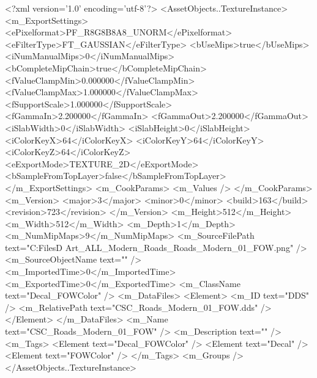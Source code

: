 <?xml version='1.0' encoding='utf-8'?>
<AssetObjects..TextureInstance>
  <m_ExportSettings>
    <ePixelformat>PF_R8G8B8A8_UNORM</ePixelformat>
    <eFilterType>FT_GAUSSIAN</eFilterType>
    <bUseMips>true</bUseMips>
    <iNumManualMips>0</iNumManualMips>
    <bCompleteMipChain>true</bCompleteMipChain>
    <fValueClampMin>0.000000</fValueClampMin>
    <fValueClampMax>1.000000</fValueClampMax>
    <fSupportScale>1.000000</fSupportScale>
    <fGammaIn>2.200000</fGammaIn>
    <fGammaOut>2.200000</fGammaOut>
    <iSlabWidth>0</iSlabWidth>
    <iSlabHeight>0</iSlabHeight>
    <iColorKeyX>64</iColorKeyX>
    <iColorKeyY>64</iColorKeyY>
    <iColorKeyZ>64</iColorKeyZ>
    <eExportMode>TEXTURE_2D</eExportMode>
    <bSampleFromTopLayer>false</bSampleFromTopLayer>
  </m_ExportSettings>
  <m_CookParams>
    <m_Values />
  </m_CookParams>
  <m_Version>
    <major>3</major>
    <minor>0</minor>
    <build>163</build>
    <revision>723</revision>
  </m_Version>
  <m_Height>512</m_Height>
  <m_Width>512</m_Width>
  <m_Depth>1</m_Depth>
  <m_NumMipMaps>9</m_NumMipMaps>
  <m_SourceFilePath text="C:\Users\Shadow\Desktop\Working Files\3D Art\Decals\CSC_ALL_Modern_Roads\textures\CSC_Roads_Modern_01_FOW.png" />
  <m_SourceObjectName text="" />
  <m_ImportedTime>0</m_ImportedTime>
  <m_ExportedTime>0</m_ExportedTime>
  <m_ClassName text="Decal_FOWColor" />
  <m_DataFiles>
    <Element>
      <m_ID text="DDS" />
      <m_RelativePath text="CSC_Roads_Modern_01_FOW.dds" />
    </Element>
  </m_DataFiles>
  <m_Name text="CSC_Roads_Modern_01_FOW" />
  <m_Description text="" />
  <m_Tags>
    <Element text="Decal_FOWColor" />
    <Element text="Decal" />
    <Element text="FOWColor" />
  </m_Tags>
  <m_Groups />
</AssetObjects..TextureInstance>